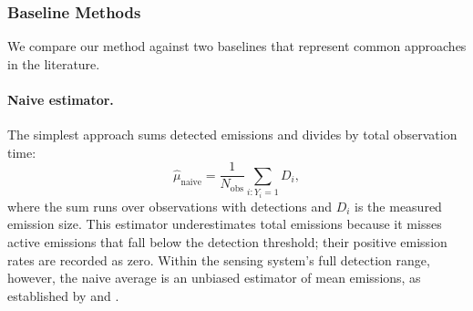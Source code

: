 \documentclass[numsec,webpdf,modern,mediumone]{oup-authoring-template}
\begin{document}
\subsubsection{Baseline Methods}

We compare our method against two baselines that represent common approaches in the literature.

\paragraph{Naive estimator.}
The simplest approach sums detected emissions and divides by total observation time:
\begin{equation}
    \hat{\mu}_{\text{naive}} = \frac{1}{N_{\text{obs}}} \sum_{i: Y_i = 1} D_i,
\end{equation}
where the sum runs over observations with detections and $D_i$ is the measured emission size. This estimator underestimates total emissions because it misses active emissions that fall below the detection threshold; their positive emission rates are recorded as zero. Within the sensing system's full detection range, however, the naive average is an unbiased estimator of mean emissions, as established by \citet{Chen2022EST} and \citet{Sherwin2024Nature}.
\end{document}
